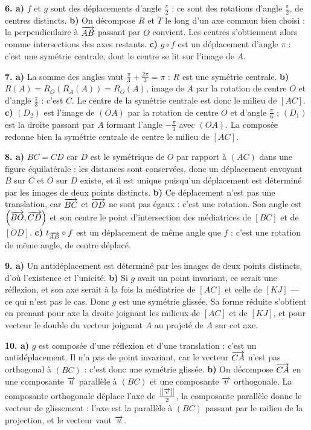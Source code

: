 \begin{corrige}[annales]
\textbf{6. a)} $f$ et $g$ sont des déplacements d'angle $\frac{\pi}{2}$ : ce
sont des rotations d'angle $\frac{\pi}{2}$, de centres distincts.
\textbf{b)} On décompose $R$ et $T$ le long d'un axe commun bien choisi : la
perpendiculaire à $\overrightarrow{AB}$ passant par $O$ convient. Les centres
s'obtiennent alors comme intersections des axes restants.
\textbf{c)} $g \circ f$ est un déplacement d'angle $\pi$ : c'est une symétrie
centrale, dont le centre se lit sur l'image de $A$.

\textbf{7. a)} La somme des angles vaut $\frac{\pi}{3}+\frac{2\pi}{3} = \pi$ :
$R$ est une symétrie centrale.
\textbf{b)} $R(A) = R_{O}\left(R_{A}(A)\right) = R_{O}(A)$, image de $A$ par
la rotation de centre $O$ et d'angle $\frac{\pi}{3}$ : c'est $C$. Le centre de
la symétrie centrale est donc le milieu de $[AC]$.
\textbf{c)} $(D_{2})$ est l'image de $(OA)$ par la rotation de centre $O$ et
d'angle $\frac{\pi}{6}$ ; $(D_{1})$ est la droite passant par $A$ formant
l'angle $-\frac{\pi}{3}$ avec $(OA)$. La composée redonne bien la symétrie
centrale de centre le milieu de $[AC]$.

\textbf{8. a)} $BC = CD$ car $D$ est le symétrique de $O$ par rapport à
$(AC)$ dans une figure équilatérale : les distances sont conservées, donc un
déplacement envoyant $B$ sur $C$ et $O$ sur $D$ existe, et il est unique
puisqu'un déplacement est déterminé par les images de deux points distincts.
\textbf{b)} Ce déplacement n'est pas une translation, car $\overrightarrow{BC}$ et
$\overrightarrow{OD}$ ne sont pas égaux : c'est une rotation. Son angle est
$\left(\overrightarrow{BO},\overrightarrow{CD}\right)$ et son centre le point d'intersection des
médiatrices de $[BC]$ et de $[OD]$.
\textbf{c)} $t_{\overrightarrow{AB}} \circ f$ est un déplacement de même angle que $f$ :
c'est une rotation de même angle, de centre déplacé.

\textbf{9. a)} Un antidéplacement est déterminé par les images de deux points
distincts, d'où l'existence et l'unicité.
\textbf{b)} Si $g$ avait un point invariant, ce serait une réflexion, et son
axe serait à la fois la médiatrice de $[AC]$ et celle de $[KJ]$ — ce qui n'est
pas le cas. Donc $g$ est une symétrie glissée. Sa forme réduite s'obtient en
prenant pour axe la droite joignant les milieux de $[AC]$ et de $[KJ]$, et
pour vecteur le double du vecteur joignant $A$ au projeté de $A$ sur cet axe.

\textbf{10. a)} $g$ est composée d'une réflexion et d'une translation :
c'est un antidéplacement. Il n'a pas de point invariant, car le vecteur
$\overrightarrow{CA}$ n'est pas orthogonal à $(BC)$ : c'est donc une symétrie glissée.
\textbf{b)} On décompose $\overrightarrow{CA}$ en une composante $\overrightarrow{u}$ parallèle à
$(BC)$ et une composante $\overrightarrow{v}$ orthogonale. La composante orthogonale
déplace l'axe de $\frac{\left\lVert \overrightarrow{v} \right\rVert}{2}$, la composante parallèle donne le
vecteur de glissement : l'axe est la parallèle à $(BC)$ passant par le milieu
de la projection, et le vecteur vaut $\overrightarrow{u}$.
\end{corrige}

